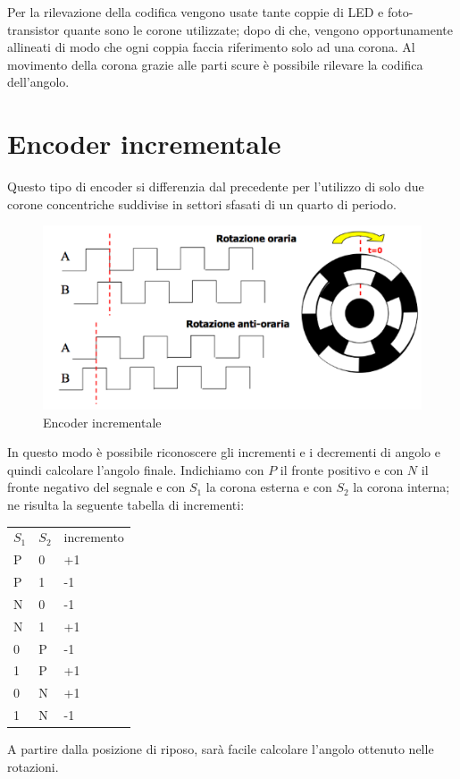 Per la rilevazione della codifica vengono usate tante coppie di LED e
foto-transistor quante sono le corone utilizzate; dopo di che, vengono
opportunamente allineati di modo che ogni coppia faccia riferimento
solo ad una corona. Al movimento della corona grazie alle parti scure
è possibile rilevare la codifica dell'angolo.

\section{Encoder incrementale}
Questo tipo di encoder si differenzia dal precedente per l'utilizzo
di solo due corone concentriche suddivise in settori sfasati di un
quarto di periodo.

\begin{figure}[htbp]
	\centering
	\includegraphics[scale=0.5]
			{img/encoderincr.png}
	\caption{Encoder incrementale\label{fig:encored}}
\end{figure}

In questo modo è possibile riconoscere gli incrementi e i decrementi
di angolo e quindi calcolare l'angolo finale. Indichiamo con $P$ il
fronte positivo e con $N$ il fronte negativo del segnale e con $S_1$
la corona esterna e con $S_2$ la corona interna; ne risulta la
seguente tabella di incrementi:

\begin{center}
\begin{tabular}{lll}
$S_1$ & $S_2$ & incremento\\
P & 0 & +1\\
P & 1 & -1\\
N & 0 & -1\\
N & 1 & +1\\
0 & P & -1\\
1 & P & +1\\
0 & N & +1\\
1 & N & -1
\end{tabular}
\end{center}

A partire dalla posizione di riposo, sarà facile calcolare l'angolo
ottenuto nelle rotazioni.
